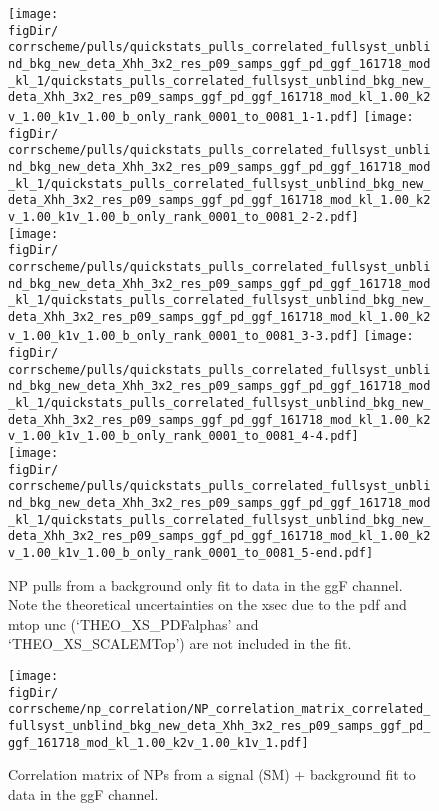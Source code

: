 

\begin{figure}[htp]
\centering
	\texttt{[image: \\figDir/\\corrscheme/pulls/quickstats\_pulls\_correlated\_fullsyst\_unblind\_bkg\_new\_deta\_Xhh\_3x2\_res\_p09\_samps\_ggf\_pd\_ggf\_161718\_mod\_kl\_1/quickstats\_pulls\_correlated\_fullsyst\_unblind\_bkg\_new\_deta\_Xhh\_3x2\_res\_p09\_samps\_ggf\_pd\_ggf\_161718\_mod\_kl\_1.00\_k2v\_1.00\_k1v\_1.00\_b\_only\_rank\_0001\_to\_0081\_1-1.pdf]}
	\texttt{[image: \\figDir/\\corrscheme/pulls/quickstats\_pulls\_correlated\_fullsyst\_unblind\_bkg\_new\_deta\_Xhh\_3x2\_res\_p09\_samps\_ggf\_pd\_ggf\_161718\_mod\_kl\_1/quickstats\_pulls\_correlated\_fullsyst\_unblind\_bkg\_new\_deta\_Xhh\_3x2\_res\_p09\_samps\_ggf\_pd\_ggf\_161718\_mod\_kl\_1.00\_k2v\_1.00\_k1v\_1.00\_b\_only\_rank\_0001\_to\_0081\_2-2.pdf]} \\
	\texttt{[image: \\figDir/\\corrscheme/pulls/quickstats\_pulls\_correlated\_fullsyst\_unblind\_bkg\_new\_deta\_Xhh\_3x2\_res\_p09\_samps\_ggf\_pd\_ggf\_161718\_mod\_kl\_1/quickstats\_pulls\_correlated\_fullsyst\_unblind\_bkg\_new\_deta\_Xhh\_3x2\_res\_p09\_samps\_ggf\_pd\_ggf\_161718\_mod\_kl\_1.00\_k2v\_1.00\_k1v\_1.00\_b\_only\_rank\_0001\_to\_0081\_3-3.pdf]}
	\texttt{[image: \\figDir/\\corrscheme/pulls/quickstats\_pulls\_correlated\_fullsyst\_unblind\_bkg\_new\_deta\_Xhh\_3x2\_res\_p09\_samps\_ggf\_pd\_ggf\_161718\_mod\_kl\_1/quickstats\_pulls\_correlated\_fullsyst\_unblind\_bkg\_new\_deta\_Xhh\_3x2\_res\_p09\_samps\_ggf\_pd\_ggf\_161718\_mod\_kl\_1.00\_k2v\_1.00\_k1v\_1.00\_b\_only\_rank\_0001\_to\_0081\_4-4.pdf]} \\
	\texttt{[image: \\figDir/\\corrscheme/pulls/quickstats\_pulls\_correlated\_fullsyst\_unblind\_bkg\_new\_deta\_Xhh\_3x2\_res\_p09\_samps\_ggf\_pd\_ggf\_161718\_mod\_kl\_1/quickstats\_pulls\_correlated\_fullsyst\_unblind\_bkg\_new\_deta\_Xhh\_3x2\_res\_p09\_samps\_ggf\_pd\_ggf\_161718\_mod\_kl\_1.00\_k2v\_1.00\_k1v\_1.00\_b\_only\_rank\_0001\_to\_0081\_5-end.pdf]}	%
	\caption{NP pulls from a background only fit to data in the ggF channel. Note the theoretical uncertainties on the xsec due to the pdf and mtop unc (`THEO\_XS\_PDFalphas' and `THEO\_XS\_SCALEMTop') are not included in the fit.
	}
	\label{fig:ggf-pulls-corr-bonly}
\end{figure}




\begin{figure}[htp]
\centering
	\texttt{[image: \\figDir/\\corrscheme/np\_correlation/NP\_correlation\_matrix\_correlated\_fullsyst\_unblind\_bkg\_new\_deta\_Xhh\_3x2\_res\_p09\_samps\_ggf\_pd\_ggf\_161718\_mod\_kl\_1.00\_k2v\_1.00\_k1v\_1.pdf]}
	\caption{Correlation matrix of NPs from a signal (SM) + background fit to data in the ggF channel.}
	\label{fig:ggf-correlation-matrix-corr-sm}
\end{figure}

